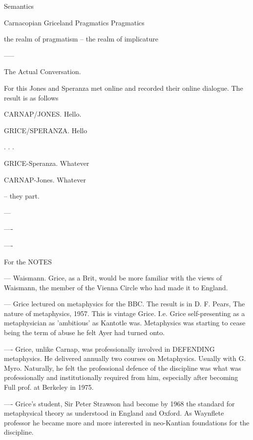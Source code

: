 \documentclass[10pt,titlepage]{book}
\begin{document}
{                   Semantics
 
 
Carnacopian                        Griceland
Pragmatics                       Pragmatics
 
the realm 
of 
pragmatism                                -- the realm of implicature
 
 
 
 
-----
 
The Actual Conversation.
 
For this Jones and Speranza
met online and recorded their online
dialogue. The result is as follows
 
 
CARNAP/JONES. Hello.
 
GRICE/SPERANZA. Hello
 
.
.
.
 
 
 
 
 
GRICE-Speranza. Whatever
 
CARNAP-Jones. Whatever
 
             --  they part.
 
---
 
----
 
 
----
 
 
For the NOTES
 
 
--- Waismann. Grice, as a Brit, would be more familiar with the views of  
Waismann, the member of the Vienna Circle who had made it to England. 
 
--- Grice lectured on metaphysics for the BBC. The result is in D. F.  
Pears, The nature of metaphysics, 1957. This is vintage Grice. I.e. Grice  
self-presenting as a metaphysician as 'ambitious' as Kantotle was. Metaphysics  
was starting to cease being the term of abuse he felt Ayer had turned  onto.

  
---- Grice, unlike Carnap, was professionally involved in DEFENDING  
metaphysics. He delivered annually two courses on Metaphysics. Usually with G.  
Myro. Naturally, he felt the professional defence of the discipline was what 
was  professionally and institutionally required from him, especially after 
becoming  Full prof. at Berkeley in 1975. 
 
---- Grice's student, Sir Peter Strawson had become by 1968 the standard  
for metaphysical theory as understood in England and Oxford. As Waynflete  
professor he became more and more interested in neo-Kantian foundations for 
the  discipline.
 
}
\end{document}
